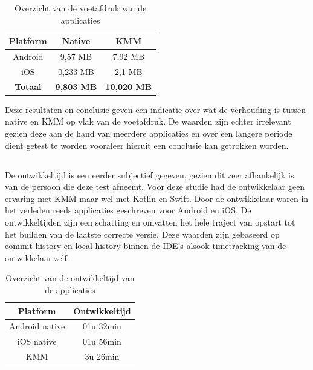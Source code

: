 \begin{table}[H]
    \centering
    \caption{Overzicht van de voetafdruk van de applicaties}
    \begin{tabular}{|c|c|c|}
        \hline
        {\textbf{Platform}} & {\textbf{Native}}  & {\textbf{KMM}}\\ \hline \hline
        Android&9,57 MB&7,92 MB\\ \hline
        iOS&0,233 MB&2,1 MB\\ \hline \hline
        \textbf{Totaal}&\textbf{9,803 MB}&\textbf{10,020 MB}\\ \hline
    \end{tabular}
    \label{T:voetafruk-overzicht}
\end{table}

Deze resultaten en conclusie geven een indicatie over wat de verhouding is tussen native en KMM op vlak van de voetafdruk. De waarden zijn echter irrelevant gezien deze aan de hand van meerdere applicaties en over een langere periode dient getest te worden vooraleer hieruit een conclusie kan getrokken worden.

\subsection{}
\label{sec:M-test-ontwikkeltijd}
De ontwikkeltijd is een eerder subjectief gegeven, gezien dit zeer afhankelijk is van de persoon die deze test afneemt. Voor deze studie had de ontwikkelaar geen ervaring met KMM maar wel met Kotlin en Swift. Door de ontwikkelaar waren in het verleden reeds applicaties geschreven voor Android en iOS. De ontwikkeltijden zijn een schatting en omvatten het hele traject van opstart tot het builden van de laatste correcte versie. Deze waarden zijn gebaseerd op commit history en local history binnen de IDE's alsook timetracking van de ontwikkelaar zelf.

\begin{table}[H]
    \centering
    \caption{Overzicht van de ontwikkeltijd van de applicaties}
    \begin{tabular}{|c|c|}
        \hline
        {\textbf{Platform}} & {\textbf{Ontwikkeltijd}}\\ \hline \hline
        Android native&01u 32min\\ \hline
        iOS native&01u 56min\\ \hline
        KMM&3u 26min\\ \hline
    \end{tabular}
    \label{T:ontwikkeltijd-overzicht}
\end{table}

